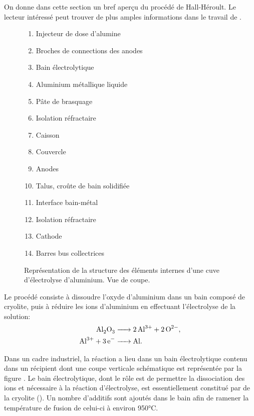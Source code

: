 On donne dans cette section un bref aperçu du procédé de
Hall-Héroult. Le lecteur intéressé peut trouver de plus amples
informations dans le travail de \cite{grjotheim1977aluminium}.

\begin{figure}[t]
\begin{center}
  
  \begin{multicols}{2}
    \small
    \begin{enumerate}[label=(\alph*)]
    \item Injecteur de dose d'alumine
    \item Broches de connections des anodes
    \item Bain électrolytique
    \item Aluminium métallique liquide
    \item Pâte de brasquage
    \item Isolation réfractaire
    \item Caisson
    \item Couvercle
    \item Anodes
    \item Talus, croûte de bain solidifiée
    \item Interface bain-métal
    \item Isolation réfractaire
    \item Cathode
    \item Barres bus collectrices
    \end{enumerate}
  \end{multicols}
  \caption{Représentation de la structure des éléments internes
    d'une cuve d'électrolyse d'aluminium. Vue de coupe.}
  \label{fig:electrolysis-pot}
\end{center}
\end{figure}

Le procédé consiste à dissoudre l'oxyde d'aluminium dans un bain
composé de cryolite, puis à réduire les ions d'aluminium en effectuant
l'électrolyse de la solution:
\begin{align}
  \cee{Al2O3 &-> 2Al^{3+} + 2O^{2-}},\label{reac:dissociation}\\
  \cee{Al^{3+} + 3e^{-} &-> Al}.\label{reac:electrolysis}
\end{align}

Dans un cadre industriel, la réaction a lieu dans un bain
électrolytique contenu dans un récipient dont une coupe verticale
schématique est représentée par la figure . Le
bain électrolytique, dont le rôle est de permettre la dissociation des
ions  et  nécessaire à la réaction
d'électrolyse, est essentiellement constitué par de la cryolite
(). Un nombre d'additifs sont ajoutés dans le bain afin
de ramener la température de fusion de celui-ci à environ
\num{950}\si\celsius.

